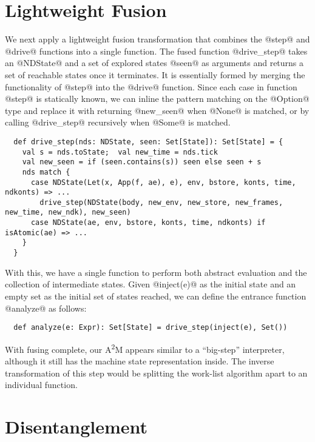 \documentclass[acmsmall, screen]{acmart}\settopmatter{}
\begin{document}
\section{Lightweight Fusion} \label{fusing}

We next apply a lightweight fusion transformation that combines the @step@ and @drive@
functions into a single function.
The fused function @drive_step@ takes an @NDState@ and a set of explored states @seen@
as arguments and returns a set of reachable states once it terminates.
It is essentially formed by merging the functionality of @step@ into the @drive@ function.
Since each case in function @step@ is statically known, we can inline the pattern matching on the
@Option@ type and replace it with returning @new_seen@ when @None@ is matched, or by calling
@drive_step@ recursively when @Some@ is matched.

\begin{lstlisting}
  def drive_step(nds: NDState, seen: Set[State]): Set[State] = {
    val s = nds.toState;  val new_time = nds.tick
    val new_seen = if (seen.contains(s)) seen else seen + s
    nds match {
      case NDState(Let(x, App(f, ae), e), env, bstore, konts, time, ndkonts) => ...
        drive_step(NDState(body, new_env, new_store, new_frames, new_time, new_ndk), new_seen)
      case NDState(ae, env, bstore, konts, time, ndkonts) if isAtomic(ae) => ...
    }
  }
\end{lstlisting}

With this, we have a single function to perform both abstract evaluation and the collection of
intermediate states. Given @inject(e)@ as the initial state and an empty set as the
initial set of states reached, we can define the entrance function @analyze@ as follows:

\begin{lstlisting}
  def analyze(e: Expr): Set[State] = drive_step(inject(e), Set())
\end{lstlisting}

With fusing complete, our A\textsuperscript{2}M appears similar to a ``big-step'' interpreter, although it
still has the machine state representation inside. The inverse transformation of this step
would be splitting the work-list algorithm apart to an individual function.

\section{Disentanglement} \label{disen}
\end{document}
